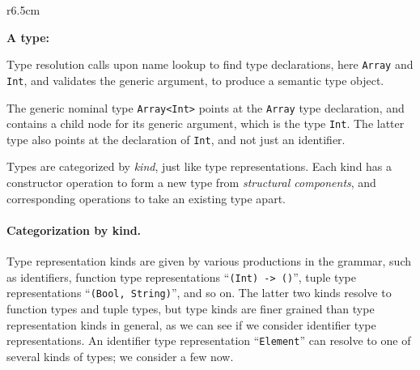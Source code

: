 \documentclass[../generics]{subfiles}
\begin{document}
\medskip

\begin{wrapfigure}[13]{r}{6.5cm}
\begin{center}
\textbf{A type:}
\end{center}
\end{wrapfigure}

Type resolution calls upon name lookup to find type declarations, here \texttt{Array} and \texttt{Int}, and validates the generic argument, to produce a semantic type object.

The generic nominal type \texttt{Array<Int>} points at the \texttt{Array} type declaration, and contains a child node for its generic argument, which is the type \texttt{Int}. The latter type also points at the declaration of \texttt{Int}, and not just an identifier.

Types are categorized by \emph{kind}, just like type representations. Each kind has a constructor operation to form a new type from \emph{structural components}, and corresponding operations to take an existing type apart.

\paragraph{Categorization by kind.}
Type representation kinds are given by various productions in the grammar, such as identifiers, function type representations ``\texttt{(Int) -> ()}'', tuple type representations ``\texttt{(Bool, String)}'', and so on. The latter two kinds resolve to function types and tuple types, but type kinds are finer grained than type representation kinds in general, as we can see if we consider identifier type representations. An identifier type representation ``\texttt{Element}'' can resolve to one of several kinds of types; we consider a few now.
\end{document}

